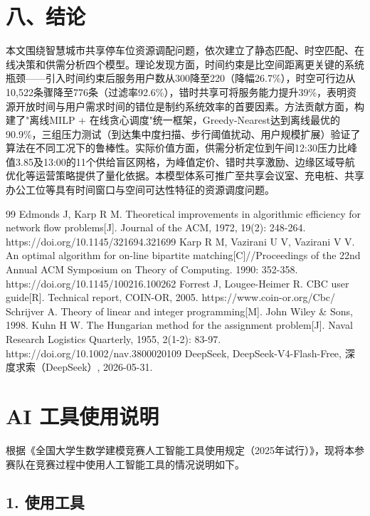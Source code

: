 \documentclass{ctexart}
\begin{document}
\section*{八、结论}

本文围绕智慧城市共享停车位资源调配问题，依次建立了静态匹配、时空匹配、在线决策和供需分析四个模型。理论发现方面，时间约束是比空间距离更关键的系统瓶颈——引入时间约束后服务用户数从300降至220（降幅26.7\%），时空可行边从10,522条骤降至776条（过滤率92.6\%），错时共享可将服务能力提升39\%，表明资源开放时间与用户需求时间的错位是制约系统效率的首要因素。方法贡献方面，构建了"离线MILP + 在线贪心调度"统一框架，Greedy-Nearest达到离线最优的90.9\%，三组压力测试（到达集中度扫描、步行阈值扰动、用户规模扩展）验证了算法在不同工况下的鲁棒性。实际价值方面，供需分析定位到午间12:30压力比峰值3.85及13:00的11个供给盲区网格，为峰值定价、错时共享激励、边缘区域导航优化等运营策略提供了量化依据。本模型体系可推广至共享会议室、充电桩、共享办公工位等具有时间窗口与空间可达性特征的资源调度问题。

\begin{thebibliography}{99}
   Edmonds J, Karp R M. Theoretical improvements in algorithmic efficiency for network flow problems[J]. Journal of the ACM, 1972, 19(2): 248-264. https://doi.org/10.1145/321694.321699
   Karp R M, Vazirani U V, Vazirani V V. An optimal algorithm for on-line bipartite matching[C]//Proceedings of the 22nd Annual ACM Symposium on Theory of Computing. 1990: 352-358. https://doi.org/10.1145/100216.100262
   Forrest J, Lougee-Heimer R. CBC user guide[R]. Technical report, COIN-OR, 2005. https://www.coin-or.org/Cbc/
   Schrijver A. Theory of linear and integer programming[M]. John Wiley \& Sons, 1998.
   Kuhn H W. The Hungarian method for the assignment problem[J]. Naval Research Logistics Quarterly, 1955, 2(1-2): 83-97. https://doi.org/10.1002/nav.3800020109
   DeepSeek, DeepSeek-V4-Flash-Free, 深度求索（DeepSeek）, 2026-05-31.\end{thebibliography}

\section*{AI 工具使用说明}

根据《全国大学生数学建模竞赛人工智能工具使用规定（2025年试行）》，现将本参赛队在竞赛过程中使用人工智能工具的情况说明如下。

\subsection*{1. 使用工具}
\end{document}
